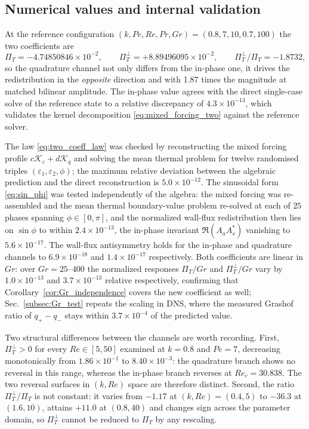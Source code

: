 \documentclass[12pt,a4paper]{article}
\newcommand{\Rey}{\mathit{Re}}
\newcommand{\Pe}{\mathit{Pe}}
\newcommand{\Grr}{\mathit{Gr}}
\renewcommand{\Pr}{\mathit{Pr}}
\newcommand{\PiT}{\Pi_T}
\begin{document}
\subsection{Numerical values and internal validation}

At the reference configuration $(k,\Pe,\Rey,\Pr,\Grr)=(0.8,7,10,0.7,100)$ the two
coefficients are
\begin{equation}
  \PiT=-4.74850846\times10^{-2},\qquad
  \PiT^{\perp}=+8.89496095\times10^{-2},\qquad
  \PiT^{\perp}/\PiT=-1.8732 ,
  \label{eq:two_coeffs_values}
\end{equation}
so the quadrature channel not only differs from the in-phase one, it drives the
redistribution in the \emph{opposite} direction and with 1.87 times the magnitude at
matched bilinear amplitude. The in-phase value agrees with the direct single-case solve of the
reference state to a relative discrepancy of $4.3\times10^{-13}$, which
validates the kernel decomposition \eqref{eq:mixed_forcing_two} against the
reference solver.

The law \eqref{eq:two_coeff_law} was checked by reconstructing the mixed forcing
profile $c\mathcal K_c+d\mathcal K_q$ and solving the mean thermal problem for twelve
randomised triples $(\varepsilon_1,\varepsilon_2,\phi)$; the maximum relative
deviation between the algebraic prediction and the direct reconstruction is
$5.0\times10^{-12}$.
The sinusoidal form \eqref{eq:sin_phi} was tested independently of the algebra: the
mixed forcing was re-assembled and the mean thermal boundary-value problem
re-solved at each of $25$ phases spanning $\phi\in[0,\pi]$, and the normalized
wall-flux redistribution then lies on $\sin\phi$ to within $2.4\times10^{-13}$, the
in-phase invariant $\Re(A_aA_s^{*})$ vanishing to $5.6\times10^{-17}$.
The wall-flux antisymmetry holds for the in-phase and quadrature channels to
$6.9\times10^{-18}$ and $1.4\times10^{-17}$ respectively. Both coefficients are linear in $\Grr$:
over $\Grr=25$--$400$ the normalized responses $\PiT/\Grr$ and $\PiT^{\perp}/\Grr$ vary
by $1.0\times10^{-13}$ and $3.7\times10^{-13}$ relative respectively, confirming that
Corollary~\ref{cor:Gr_independence} covers the new coefficient as well;
Sec.~\ref{subsec:Gr_test} repeats the scaling in DNS, where the measured Grashof
ratio of $q_+-q_-$ stays within $3.7\times10^{-4}$ of the predicted value.

Two structural differences between the channels are worth recording. First,
$\PiT^{\perp}>0$ for every $\Rey\in[5,50]$ examined at $k=0.8$ and $\Pe=7$, decreasing
monotonically from $1.86\times10^{-1}$ to $8.40\times10^{-3}$: the quadrature branch
shows no reversal in this range, whereas the in-phase branch reverses at
$\Rey_c=30.838$. The two reversal surfaces in $(k,\Rey)$ space are therefore distinct.
Second, the ratio $\PiT^{\perp}/\PiT$ is not constant: it varies from $-1.17$ at
$(k,\Rey)=(0.4,5)$ to $-36.3$ at $(1.6,10)$, attains $+11.0$ at $(0.8,40)$ and changes
sign across the parameter
domain, so $\PiT^{\perp}$ cannot be reduced to $\PiT$ by any rescaling.
\end{document}
